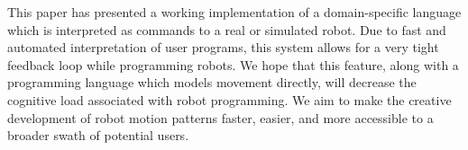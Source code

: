 \documentclass[sigchi-a]{acmart}
\begin{document}
\begin{sidebar}
%
%

\end{sidebar}

This paper has presented a working implementation of a domain-specific
language which is interpreted as commands to a real or simulated robot. 
Due to fast and automated interpretation of user programs, this system allows for a very tight
feedback loop while programming robots. We hope that this feature,
along with a programming language which models movement directly, will decrease the
cognitive load associated with robot programming. We aim to make the creative
development of robot motion patterns faster, easier, and more accessible to a
broader swath of potential users.
\end{document}
